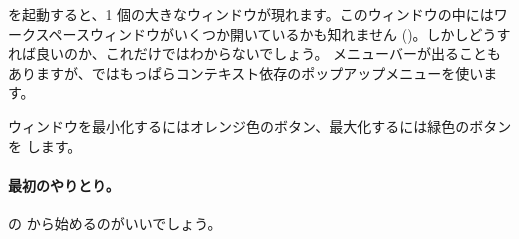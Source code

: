 \documentclass[a4paper,10pt,twoside]{book}
\begin{document}
\pharo を起動すると、1 個の大きなウィンドウが現れます。このウィンドウの中にはワークスペースウィンドウがいくつか開いているかも知れません ()。しかしどうすれば良いのか、これだけではわからないでしょう。
メニューバーが出ることもありますが、\pharo ではもっぱらコンテキスト依存のポップアップメニューを使います。


ウィンドウを最小化するにはオレンジ色のボタン、最大化するには緑色のボタンを \click します。

\paragraph{最初のやりとり。}

 の から始めるのがいいでしょう。


\end{document}
